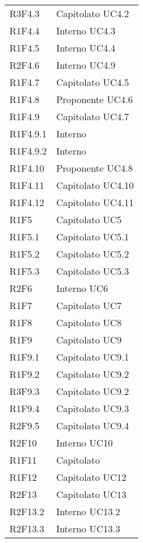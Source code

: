 \begin{longtable} {
			>{\centering}p{28mm}  
			>{}p{20mm}
		}
		R3F4.3 & Capitolato UC4.2 \TBstrut \\ [2mm]		
		R1F4.4 & Interno UC4.3 \TBstrut \\ [2mm]
		R1F4.5 & Interno UC4.4 \TBstrut \\ [2mm]
		R2F4.6 & Interno UC4.9 \TBstrut \\ [2mm]
		R1F4.7 & Capitolato UC4.5 \TBstrut \\ [2mm]
		R1F4.8 & Proponente UC4.6 \TBstrut \\ [2mm]
		R1F4.9 & Capitolato UC4.7 \TBstrut \\ [2mm]
		R1F4.9.1 & Interno \TBstrut \\ [2mm]
		R1F4.9.2 & Interno \TBstrut \\ [2mm]
		R1F4.10 & Proponente UC4.8 \TBstrut \\ [2mm]
		R1F4.11 & Capitolato UC4.10 \TBstrut \\ [2mm]
		R1F4.12 & Capitolato UC4.11 \TBstrut \\ [2mm]
		R1F5 & Capitolato UC5 \TBstrut \\ [2mm]
		R1F5.1 & Capitolato UC5.1 \TBstrut \\ [2mm]
		R1F5.2 & Capitolato UC5.2 \TBstrut \\ [2mm]
		R1F5.3 & Capitolato UC5.3 \TBstrut \\ [2mm]
		R2F6 & Interno UC6 \TBstrut \\ [2mm]		
		R1F7 & Capitolato UC7 \TBstrut \\ [2mm]
		R1F8 & Capitolato UC8 \TBstrut \\ [2mm]
		R1F9 & Capitolato UC9 \TBstrut \\ [2mm]
		R1F9.1 & Capitolato UC9.1 \TBstrut \\ [2mm]
		R1F9.2 & Capitolato UC9.2 \TBstrut \\ [2mm]
		R3F9.3 & Capitolato UC9.2 \TBstrut \\ [2mm]
		R1F9.4 & Capitolato UC9.3 \TBstrut \\ [2mm]
		R2F9.5 & Capitolato UC9.4 \TBstrut \\ [2mm]
		R2F10 & Interno UC10 \TBstrut \\ [2mm]
		R1F11 & Capitolato \TBstrut \\ [2mm]		
		R1F12 & Capitolato UC12 \TBstrut \\ [2mm]	
		R2F13 & Capitolato UC13 \TBstrut \\ [2mm]		
		R2F13.2 & Interno UC13.2 \TBstrut \\ [2mm]		
		R2F13.3 & Interno UC13.3 \TBstrut \\ [2mm]	

\end{longtable}
